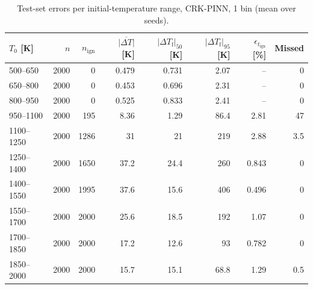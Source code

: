 \begin{table}[htbp]
    \centering
    \small
    \begin{tabular}{lrrrrrrr}
        \hline
        $T_0$ [K] & $n$ & $n_\mathrm{ign}$ & $\overline{|\Delta T|}$ [K] & $|\Delta T_\mathrm{f}|_{50}$ [K] & $|\Delta T_\mathrm{f}|_{95}$ [K] & $\epsilon_{t_\mathrm{ign}}$ [\%] & Missed \\
        \hline
        500--650 & 2000 & 0 & 0.479 & 0.731 & 2.07 & -- & 0 \\
        650--800 & 2000 & 0 & 0.453 & 0.696 & 2.31 & -- & 0 \\
        800--950 & 2000 & 0 & 0.525 & 0.833 & 2.41 & -- & 0 \\
        950--1100 & 2000 & 195 & 8.36 & 1.29 & 86.4 & 2.81 & 47 \\
        1100--1250 & 2000 & 1286 & 31 & 21 & 219 & 2.88 & 3.5 \\
        1250--1400 & 2000 & 1650 & 37.2 & 24.4 & 260 & 0.843 & 0 \\
        1400--1550 & 2000 & 1995 & 37.6 & 15.6 & 406 & 0.496 & 0 \\
        1550--1700 & 2000 & 2000 & 25.6 & 18.5 & 192 & 1.07 & 0 \\
        1700--1850 & 2000 & 2000 & 17.2 & 12.6 & 93 & 0.782 & 0 \\
        1850--2000 & 2000 & 2000 & 15.7 & 15.1 & 68.8 & 1.29 & 0.5 \\
        \hline
    \end{tabular}
    \caption{Test-set errors per initial-temperature range, CRK-PINN, 1 bin (mean over seeds).}
    \label{tab:T0_crkpinn_predicted_b1}
\end{table}
